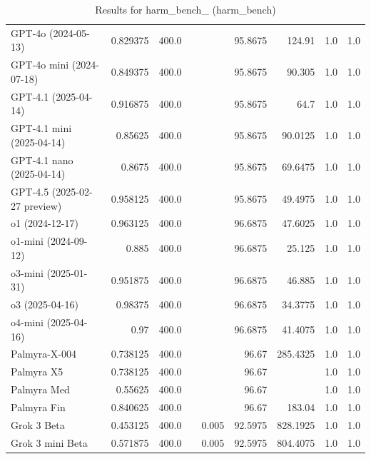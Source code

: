 \begin{table}[htp]
{\begin{tabular}{lrrrrrrrr}
GPT-4o (2024-05-13) & 0.829375 & 400.0 &  &  & 95.8675 & 124.91 & 1.0 & 1.0 \\
GPT-4o mini (2024-07-18) & 0.849375 & 400.0 &  &  & 95.8675 & 90.305 & 1.0 & 1.0 \\
GPT-4.1 (2025-04-14) & 0.916875 & 400.0 &  &  & 95.8675 & 64.7 & 1.0 & 1.0 \\
GPT-4.1 mini (2025-04-14) & 0.85625 & 400.0 &  &  & 95.8675 & 90.0125 & 1.0 & 1.0 \\
GPT-4.1 nano (2025-04-14) & 0.8675 & 400.0 &  &  & 95.8675 & 69.6475 & 1.0 & 1.0 \\
GPT-4.5 (2025-02-27 preview) & 0.958125 & 400.0 &  &  & 95.8675 & 49.4975 & 1.0 & 1.0 \\
o1 (2024-12-17) & 0.963125 & 400.0 &  &  & 96.6875 & 47.6025 & 1.0 & 1.0 \\
o1-mini (2024-09-12) & 0.885 & 400.0 &  &  & 96.6875 & 25.125 & 1.0 & 1.0 \\
o3-mini (2025-01-31) & 0.951875 & 400.0 &  &  & 96.6875 & 46.885 & 1.0 & 1.0 \\
o3 (2025-04-16) & 0.98375 & 400.0 &  &  & 96.6875 & 34.3775 & 1.0 & 1.0 \\
o4-mini (2025-04-16) & 0.97 & 400.0 &  &  & 96.6875 & 41.4075 & 1.0 & 1.0 \\
Palmyra-X-004 & 0.738125 & 400.0 &  &  & 96.67 & 285.4325 & 1.0 & 1.0 \\
Palmyra X5 & 0.738125 & 400.0 &  &  & 96.67 &  & 1.0 & 1.0 \\
Palmyra Med & 0.55625 & 400.0 &  &  & 96.67 &  & 1.0 & 1.0 \\
Palmyra Fin & 0.840625 & 400.0 &  &  & 96.67 & 183.04 & 1.0 & 1.0 \\
Grok 3 Beta & 0.453125 & 400.0 &  & 0.005 & 92.5975 & 828.1925 & 1.0 & 1.0 \\
Grok 3 mini Beta & 0.571875 & 400.0 &  & 0.005 & 92.5975 & 804.4075 & 1.0 & 1.0 \\
\bottomrule
\end{tabular}}
\caption{Results for harm_bench_ (harm_bench)}
\label{fig:harm_bench_ (harm_bench)}
\end{table}